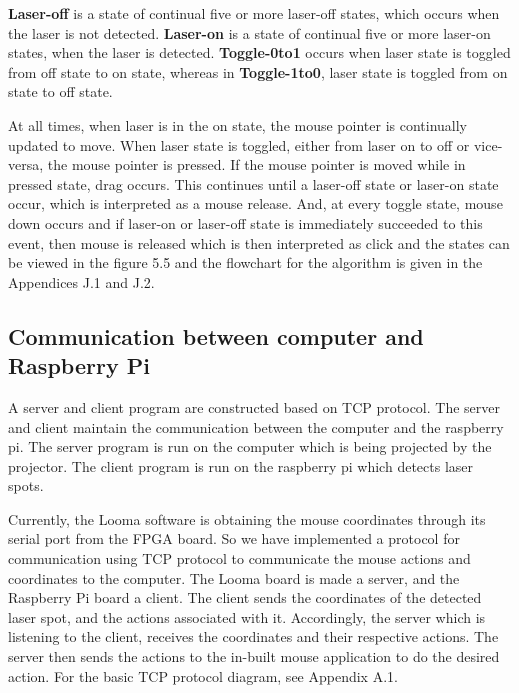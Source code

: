 \documentclass[12pt, a4paper]{article}
\begin{document}
	\textbf {Laser-off} is a state of continual five or more laser-off  states, which occurs when the laser is not detected. \textbf{Laser-on} is a state of continual five or more laser-on states, when the laser is detected. \textbf{Toggle-0to1} occurs when laser state is toggled from off state to on state, whereas in \textbf{Toggle-1to0}, laser state is toggled from on state to off state. 
	
	At all times, when laser is in the on state, the mouse pointer is continually updated to move. When laser state is toggled, either from laser on to off or vice-versa, the mouse pointer is pressed. If the mouse pointer is moved while in pressed state, drag occurs. This continues until a laser-off state or laser-on state occur, which is interpreted as a mouse release. And, at every toggle state, mouse down occurs and if laser-on or laser-off state is immediately succeeded to this event, then mouse is released which is then interpreted as click and the states can be viewed in the figure 5.5 and the flowchart for the algorithm is given in the Appendices J.1 and J.2.
\newpage


\subsection{Communication between computer and Raspberry Pi}
	A server and client program are constructed based on TCP protocol. The server and client maintain the communication between the computer and the raspberry pi. The server program is run on the computer which is being projected by the projector. The client program is run on the raspberry pi which detects laser spots. 
	
	Currently, the Looma software is obtaining the mouse coordinates through its serial port from the FPGA board. So we have implemented a protocol for communication using TCP protocol to communicate the mouse actions and coordinates to the computer. The Looma board is made a server, and the Raspberry Pi board a client. The client sends the coordinates of the detected laser spot, and the actions associated with it. Accordingly, the server which is listening to the client, receives the coordinates and their respective actions. The server then sends the actions to the in-built mouse application to do the desired action.  For the basic TCP protocol diagram, see Appendix A.1.
\end{document}
